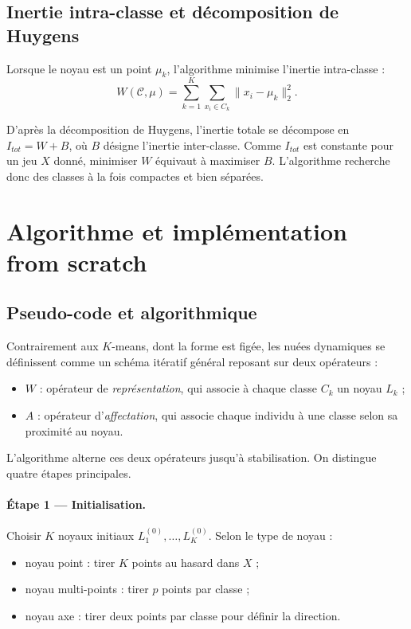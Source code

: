 \documentclass[a4paper, 11pt]{article}
\begin{document}
	\subsection{Inertie intra-classe et décomposition de Huygens}
	
	Lorsque le noyau est un point \(\mu_k\), l'algorithme minimise
	l'inertie intra-classe :
	\[
	W(\mathcal{C}, \mu) = \sum_{k=1}^{K} \sum_{x_i \in C_k}
	\|x_i - \mu_k\|_2^2.
	\]
	
	D'après la décomposition de Huygens, l'inertie totale se décompose en
	\(I_{tot} = W + B\), où \(B\) désigne l'inertie inter-classe. Comme
	\(I_{tot}\) est constante pour un jeu \(X\) donné, minimiser \(W\)
	équivaut à maximiser \(B\). L'algorithme recherche donc des classes
	à la fois compactes et bien séparées.
	
	\section{Algorithme et implémentation from scratch}
	
	\subsection{Pseudo-code et algorithmique}
	
	Contrairement aux \(K\)-means, dont la forme est figée, les nuées
	dynamiques se définissent comme un schéma itératif général reposant
	sur deux opérateurs :
	\begin{itemize}
		\item \(W\) : opérateur de \emph{représentation}, qui associe à
		chaque classe \(C_k\) un noyau \(L_k\) ;
		\item \(A\) : opérateur d'\emph{affectation}, qui associe chaque
		individu à une classe selon sa proximité au noyau.
	\end{itemize}
	
	L'algorithme alterne ces deux opérateurs jusqu'à stabilisation. On
	distingue quatre étapes principales.
	
	\paragraph{Étape 1 --- Initialisation.}
	Choisir \(K\) noyaux initiaux \(L_1^{(0)}, \dots, L_K^{(0)}\).
	Selon le type de noyau :
	\begin{itemize}
		\item noyau point : tirer \(K\) points au hasard dans \(X\) ;
		\item noyau multi-points : tirer \(p\) points par classe ;
		\item noyau axe : tirer deux points par classe pour définir la
		direction.
	\end{itemize}
	
\end{document}
